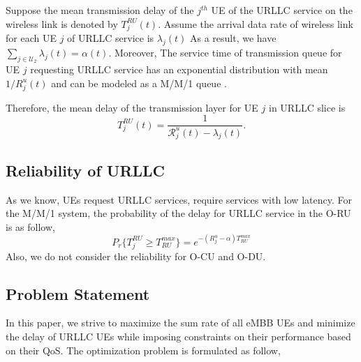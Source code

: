 \documentclass[conference]{IEEEtran}
\begin{document}
Suppose the mean transmission delay of the $j^{th}$ UE of the URLLC service on the wireless link is denoted by
$T_{j}^{RU}(t)$.
 Assume the arrival data rate of wireless link for each UE $j$ of URLLC service is $\lambda_j(t)$
As a result, we have $\sum_{j \in \mathcal{U}_2} \lambda_{j}(t) = \alpha(t)$.
Moreover, The service time of transmission queue for UE $j$ requesting URLLC service has
an exponential distribution with mean $1/R_{j}^u(t)$ and can be modeled as a M/M/1 queue \cite{SystemCostMinimization,luong2018joint,luong2018novel}.
 
Therefore, the mean delay of the transmission layer for UE $j$ in URLLC slice is
\begin{equation}
 T_{j}^{RU}(t) = \frac{1}{{\mathcal{R}}_{j}^u(t) - \lambda_{j}(t)}.
\end{equation}


\subsection{Reliability of URLLC}
As we know, UEs request URLLC services, require services with low latency.
For the M/M/1 system, the probability of the delay for URLLC service in the O-RU is as follow, 
\begin{equation}
P_r\{T_{j}^{RU} \geq T_{RU}^{max}\} = e^{-({R}_{j}^u - \alpha)T_{RU}^{max}}
\end{equation} 
Also, we do not consider the reliability for O-CU and O-DU.

\subsection{Problem Statement}
In this paper, we strive to maximize the sum rate of all eMBB UEs and minimize the delay of URLLC UEs while imposing constraints on their performance based on their QoS.
The optimization problem is formulated as follow,
\end{document}
